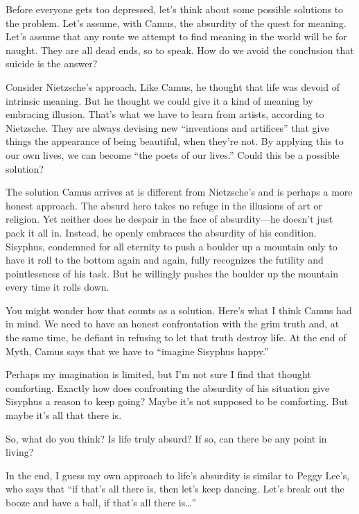 Before everyone gets too depressed, let’s think about some possible solutions to the problem. Let’s assume, with Camus, the absurdity of the quest for meaning. Let’s assume that any route we attempt to find meaning in the world will be for naught. They are all dead ends, so to speak. How do we avoid the conclusion that suicide is the answer?

Consider Nietzsche’s approach. Like Camus, he thought that life was devoid of intrinsic meaning. But he thought we could give it a kind of meaning by embracing illusion. That's what we have to learn from artists, according to Nietzsche. They are always devising new “inventions and artifices” that give things the appearance of being beautiful, when they’re not. By applying this to our own lives, we can become “the poets of our lives.” Could this be a possible solution?

The solution Camus arrives at is different from Nietzsche’s and is perhaps a more honest approach. The absurd hero takes no refuge in the illusions of art or religion. Yet neither does he despair in the face of absurdity—he doesn't just pack it all in. Instead, he openly embraces the absurdity of his condition. Sisyphus, condemned for all eternity to push a boulder up a mountain only to have it roll to the bottom again and again, fully recognizes the futility and pointlessness of his task. But he willingly pushes the boulder up the mountain every time it rolls down.

You might wonder how that counts as a solution. Here’s what I think Camus had in mind. We need to have an honest confrontation with the grim truth and, at the same time, be defiant in refusing to let that truth destroy life. At the end of Myth, Camus says that we have to “imagine Sisyphus happy.”

Perhaps my imagination is limited, but I’m not sure I find that thought comforting. Exactly how does confronting the absurdity of his situation give Sisyphus a reason to keep going? Maybe it’s not supposed to be comforting. But maybe it’s all that there is.

So, what do you think? Is life truly absurd? If so, can there be any point in living?

In the end, I guess my own approach to life’s absurdity is similar to Peggy Lee’s, who says that “if that’s all there is, then let’s keep dancing. Let’s break out the booze and have a ball, if that’s all there is…”